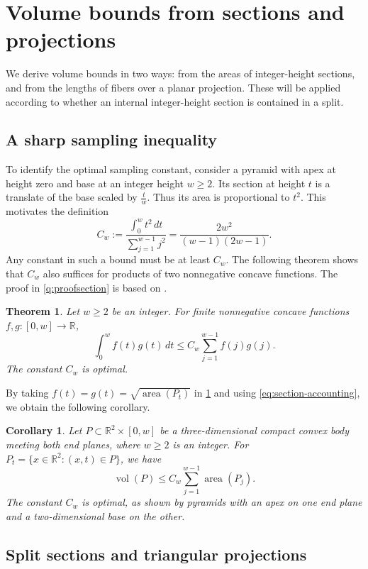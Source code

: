 \documentclass[reqno, 11pt]{article}
\numberwithin{equation}{section}
\newtheorem{theorem}{Theorem}[section]
\newtheorem{corollary}[corollary]{Corollary}
\theoremstyle{definition}
\newcommand{\R}{\mathbb R}
\DeclareMathOperator{\vol}{vol}
\DeclareMathOperator{\area}{area}
\numberwithin{equation}{section}
\begin{document}
\section{Volume bounds from sections and projections}\label{sec:volume}
We derive volume bounds in two ways: from the areas of integer-height
sections, and from the lengths of fibers over a planar projection.
These will be applied according to whether an internal integer-height
section is contained in a split.

\subsection{A sharp sampling inequality}\label{q:section}
To identify the optimal sampling constant, consider a pyramid with apex at height zero and base at an integer height $w\ge2$. Its section at height $t$ is a translate of the base scaled by $\frac{t}{w}$. Thus its area is proportional to \(t^2\). This motivates the definition
\[
C_w := \frac{\int_0^w t^2 \, dt}{\sum_{j=1}^{w-1} j^2} = \frac{2w^2}{(w-1)(2w-1)}.
\]
Any constant in such a bound must be at least $C_w$. The following theorem shows that $C_w$ also suffices for products of two nonnegative concave functions. The proof in \cref{q:proofsection} is based on \cite[Theorem~4.1]{HM1995}.

\begin{theorem}\label{q:bilinear}
Let $w\ge2$ be an integer. For finite nonnegative concave functions $f,g:[0,w]\to\R$,
\[
 \int_0^w f(t)g(t)\,dt \le C_w\sum_{j=1}^{w-1}f(j)g(j).
\]
The constant $C_w$ is optimal.
\end{theorem}

By taking $f(t)=g(t)=\sqrt{\area(P_t)}$ in \cref{q:bilinear} and using \eqref{eq:section-accounting},
we obtain the following corollary. 
\begin{corollary}\label{q:volume}
Let $P\subset\R^2\times[0,w]$ be a three-dimensional compact convex body meeting both end planes, where $w\ge2$ is an integer.
For $P_t=\{x\in\R^2:(x,t)\in P\}$, we have 
\begin{equation}\label{q:volume-ineq}
 \vol(P)\le C_w\sum_{j=1}^{w-1}\area(P_j).
\end{equation}
The constant $C_w$ is optimal, as shown by pyramids with an apex on one end plane and a two-dimensional base on the other.
\end{corollary}


\subsection{Split sections and triangular projections}\label{sec:projection}
\end{document}
